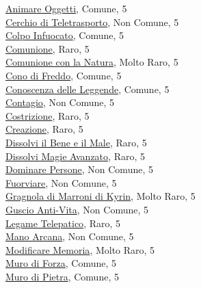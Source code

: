 \begin{multicols}{3}
{{\hyperlink{Animare Oggetti}{Animare Oggetti}, Comune, 5\\
\hyperlink{Cerchio di Teletrasporto}{Cerchio di Teletrasporto}, Non Comune, 5\\
\hyperlink{Colpo Infuocato}{Colpo Infuocato}, Comune, 5\\
\hyperlink{Comunione}{Comunione}, Raro, 5\\
\hyperlink{Comunione con la Natura}{Comunione con la Natura}, Molto Raro, 5\\
\hyperlink{Cono di Freddo}{Cono di Freddo}, Comune, 5\\
\hyperlink{Conoscenza delle Leggende}{Conoscenza delle Leggende}, Comune, 5\\
\hyperlink{Contagio}{Contagio}, Non Comune, 5\\
\hyperlink{Costrizione}{Costrizione}, Raro, 5\\
\hyperlink{Creazione}{Creazione}, Raro, 5\\
\hyperlink{Dissolvi il Bene e il Male}{Dissolvi il Bene e il Male}, Raro, 5\\
\hyperlink{Dissolvi Magie Avanzato}{Dissolvi Magie Avanzato}, Raro, 5\\
\hyperlink{Dominare Persone}{Dominare Persone}, Non Comune, 5\\
\hyperlink{Fuorviare}{Fuorviare}, Non Comune, 5\\
\hyperlink{Gragnola di Marroni di Kyrin}{Gragnola di Marroni di Kyrin}, Molto Raro, 5\\
\hyperlink{Guscio Anti-Vita}{Guscio Anti-Vita}, Non Comune, 5\\
\hyperlink{Legame Telepatico}{Legame Telepatico}, Raro, 5\\
\hyperlink{Mano Arcana}{Mano Arcana}, Non Comune, 5\\
\hyperlink{Modificare Memoria}{Modificare Memoria}, Molto Raro, 5\\
\hyperlink{Muro di Forza}{Muro di Forza}, Comune, 5\\
\hyperlink{Muro di Pietra}{Muro di Pietra}, Comune, 5\\
}}
\end{multicols}
